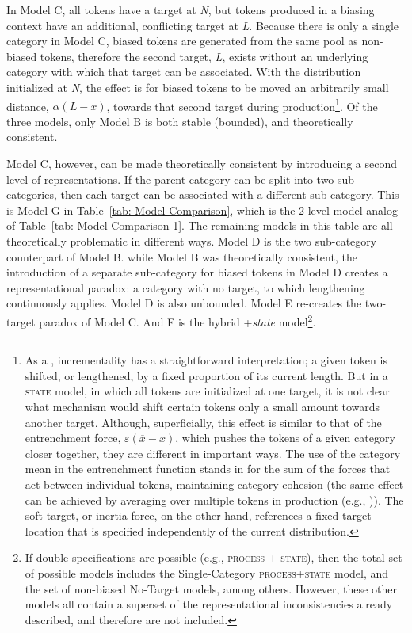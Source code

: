 In Model C, all tokens have a target at \emph{N}, but tokens produced
in a biasing context have an additional, conflicting target at \emph{L}.
Because there is only a single category in Model C, biased tokens
are generated from the same pool as non-biased tokens, therefore the
second target, \emph{L}, exists without an underlying category with
which that target can be associated. With the distribution initialized
at \emph{N}, the effect is for biased tokens to be moved an arbitrarily
small distance, $\alpha(L-x)$, towards that second target during
production\footnote{As a , incrementality has a straightforward interpretation;
a given token is shifted, or lengthened, by a fixed proportion of
its current length. But in a \textsc{state} model, in which all tokens
are initialized at one target, it is not clear what mechanism would
shift certain tokens only a small amount towards another target. Although,
superficially, this effect is similar to that of the entrenchment
force, $\varepsilon(\overline{x}-x)$, which pushes the tokens of
a given category closer together, they are different in important
ways. The use of the category mean in the entrenchment function stands
in for the sum of the forces that act between individual tokens, maintaining
category cohesion (the same effect can be achieved by averaging over
multiple tokens in production (e.g., \citealt{Pierrehumbert2000,Wedela})).
The soft target, or inertia force, on the other hand, references a
fixed target location that is specified independently of the current
distribution. }. Of the three models, only Model B is both stable (bounded), and
theoretically consistent. 

Model C, however, can be made theoretically consistent by introducing
a second level of representations. If the parent category can be split
into two sub-categories, then each target can be associated with a
different sub-category. This is Model G in Table~\ref{tab: Model Comparison},
which is the 2-level model analog of Table~\ref{tab: Model Comparison-1}.
The remaining models in this table are all theoretically problematic
in different ways. Model D is the two sub-category counterpart of
Model B. while Model B was theoretically consistent, the introduction
of a separate sub-category for biased tokens in Model D creates a
representational paradox: a category with no target, to which lengthening
continuously applies. Model D is also unbounded. Model E re-creates
the two-target paradox of Model C. And F is the hybrid +\emph{state}
model\footnote{If double specifications are possible (e.g., \textsc{process} + \textsc{state}),
then the total set of possible models includes the Single-Category
\textsc{process}+\textsc{state} model, and the set of non-biased No-Target
models, among others. However, these other models all contain a superset
of the representational inconsistencies already described, and therefore
are not included.}.

